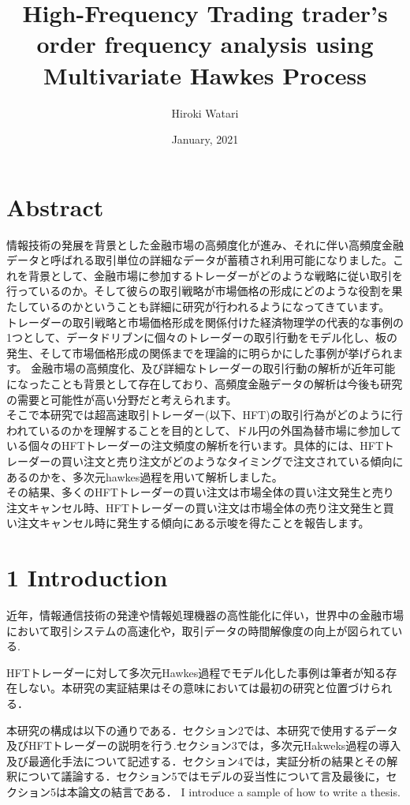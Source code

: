 \documentclass[a4paper,11pt,oneside,openany]{book}
\title{High-Frequency Trading trader's order frequency analysis using Multivariate Hawkes Process}
\author{Hiroki Watari}
\affiliation{%
  Graduate Major in Artificial Intelligence\\
  School of Computing\\
  Tokyo Institute of Technology}
\date{January, 2021}
\begin{document}
\frontmatter
\maketitle
\chapter{Abstract}
情報技術の発展を背景とした金融市場の高頻度化が進み、それに伴い高頻度金融データと呼ばれる取引単位の詳細なデータが蓄積され利用可能になりました。これを背景として、金融市場に参加するトレーダーがどのような戦略に従い取引を行っているのか。そして彼らの取引戦略が市場価格の形成にどのような役割を果たしているのかということも詳細に研究が行われるようになってきています。\\
トレーダーの取引戦略と市場価格形成を関係付けた経済物理学の代表的な事例の1つとして、データドリブンに個々のトレーダーの取引行動をモデル化し、板の発生、そして市場価格形成の関係までを理論的に明らかにした事例が挙げられます。 金融市場の高頻度化、及び詳細なトレーダーの取引行動の解析が近年可能になったことも背景として存在しており、高頻度金融データの解析は今後も研究の需要と可能性が高い分野だと考えられます。\\
そこで本研究では超高速取引トレーダー(以下、HFT)の取引行為がどのように行われているのかを理解することを目的として、ドル円の外国為替市場に参加している個々のHFTトレーダーの注文頻度の解析を行います。具体的には、HFTトレーダーの買い注文と売り注文がどのようなタイミングで注文されている傾向にあるのかを、多次元hawkes過程を用いて解析しました。\\
その結果、多くのHFTトレーダーの買い注文は市場全体の買い注文発生と売り注文キャンセル時、HFTトレーダーの買い注文は市場全体の売り注文発生と買い注文キャンセル時に発生する傾向にある示唆を得たことを報告します。

\tableofcontents

\chapter{1 Introduction}
近年，情報通信技術の発達や情報処理機器の高性能化に伴い，世界中の金融市場において取引システムの高速化や，取引データの時間解像度の向上が図られている.

HFTトレーダーに対して多次元Hawkes過程でモデル化した事例は筆者が知る存在しない。本研究の実証結果はその意味においては最初の研究と位置づけられる．



本研究の構成は以下の通りである．セクション2では、本研究で使用するデータ及びHFTトレーダーの説明を行う.セクション3では，多次元Hakweks過程の導入及び最適化手法について記述する．セクション4では，実証分析の結果とその解釈について議論する．セクション5ではモデルの妥当性について言及最後に，セクション5は本論文の結言である．
I introduce a sample of how to write a thesis\cite{1}.
\end{document}
